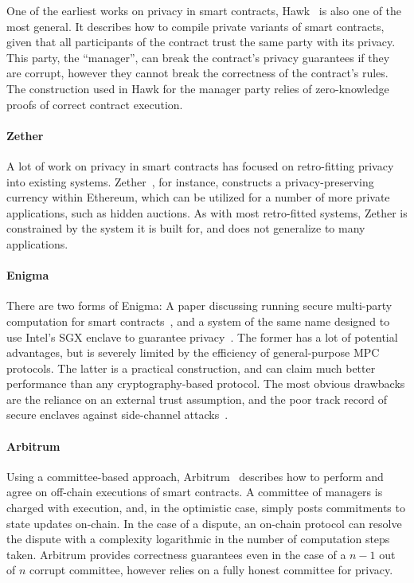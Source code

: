 One of the earliest works on privacy in smart contracts, Hawk~\cite{SP:KMSWP16}
is also one of the most general. It describes how to compile private variants
of smart contracts, given that all participants of the contract trust the same
party with its privacy. This party, the ``manager'', can break the contract's
privacy guarantees if they are corrupt, however they cannot break the correctness of the
contract's rules. The construction used in Hawk for the manager party relies of
zero-knowledge proofs of correct contract execution.

\paragraph{Zether}

\sloppy
A lot of work on privacy in smart contracts has focused on retro-fitting privacy
into existing systems. Zether~\cite{zether}, for instance, constructs a
privacy-preserving currency within Ethereum, which can be utilized for a number
of more private applications, such as hidden auctions. As with most retro-fitted
systems, Zether is constrained by the system it is built for, and does not
generalize to many applications.

\fussy

\paragraph{Enigma}

There are two forms of Enigma: A paper discussing running secure multi-party
computation for smart contracts~\cite{enigmapaper}, and a system of the same
name designed to use Intel's SGX enclave to guarantee
privacy~\cite{enigmawebsite}. The former has a lot of potential advantages, but
is severely limited by the efficiency of general-purpose MPC protocols. The
latter is a practical construction, and can claim much better performance than
any cryptography-based protocol. The most obvious drawbacks are the reliance on
an external trust assumption, and the poor track record of secure enclaves
against side-channel attacks~\cite{foreshadow}.

\paragraph{Arbitrum}

Using a committee-based approach, Arbitrum~\cite{USENIX:KGCWF18} describes how
to perform and agree on off-chain executions of smart contracts. A committee of
managers is charged with execution, and, in the optimistic case, simply posts
commitments to state updates on-chain. In the case of a dispute, an on-chain
protocol can resolve the dispute with a complexity logarithmic in the number of
computation steps taken. Arbitrum provides correctness guarantees even in the
case of a $n-1$ out of $n$ corrupt committee, however relies on a fully honest
committee for privacy.

